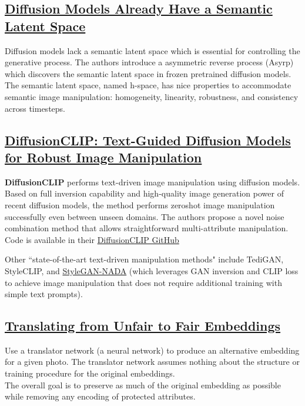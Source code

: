 \documentclass[12pt]{amsart}
\begin{document}
\subsection{\href{https://openreview.net/pdf?id=pd1P2eUBVfq}{Diffusion Models Already Have a Semantic Latent Space}}

\begin{approach*}
Diffusion models lack a semantic latent space which is essential for controlling the generative process. The authors introduce a asymmetric reverse process (Asyrp) which discovers the semantic latent space in frozen pretrained diffusion models. The semantic latent space, named h-space, has nice properties to accommodate semantic image manipulation: homogeneity, linearity, robustness, and consistency across timesteps.
\end{approach*}

\subsection{\href{https://arxiv.org/pdf/2110.02711.pdf}{DiffusionCLIP: Text-Guided Diffusion Models for Robust Image Manipulation}}

\begin{approach*}
\textbf{DiffusionCLIP} performs text-driven image manipulation using diffusion models. Based on full inversion capability and high-quality image generation power of recent diffusion models, the method performs zeroshot image manipulation successfully even between unseen domains. The authors propose a novel noise combination
method that allows straightforward multi-attribute manipulation. Code is available in their
\href{https://github.com/gwang-kim/DiffusionCLIP.git}{DiffusionCLIP GitHub}
\end{approach*}

Other ``state-of-the-art text-driven manipulation methods" include TediGAN, StyleCLIP, and \href{https://arxiv.org/pdf/2108.00946.pdf}{StyleGAN-NADA} (which leverages GAN inversion and CLIP loss to achieve image manipulation that does not require additional training with simple text prompts).

\subsection{\href{https://hci.stanford.edu/courses/cs335/2020/sp/dimsonthomas_86285_6198916_report.pdf}{Translating from Unfair to Fair Embeddings}}

\begin{approach*}
Use a translator network (a neural network) to produce an alternative embedding for a given photo. The translator network assumes nothing about the structure or training procedure for the original embeddings. \\

The overall goal is to preserve as much of the original embedding as possible while removing any encoding of protected attributes.
\end{approach*}
\end{document}
